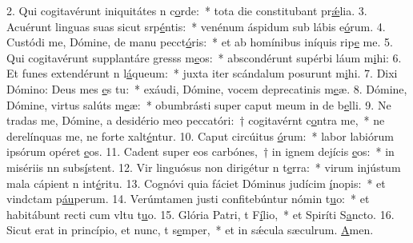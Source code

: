 2. Qui cogitavérunt iniquitátes n c\uline{o}rde:~* tota die constitubant pr\uline{ǽ}lia.
3. Acuérunt linguas suas sicut srp\uline{é}ntis:~* venénum áspidum sub lábis e\uline{ó}rum.
4. Custódi me, Dómine, de manu pecct\uline{ó}ris:~* et ab homínibus iníquis rip\uline{e} me.
5. Qui cogitavérunt supplantáre gresss m\uline{e}os:~* abscondérunt supérbi láum m\uline{i}hi:
6. Et funes extendérunt n l\uline{á}queum:~* juxta iter scándalum posurunt m\uline{i}hi.
7. Dixi Dómino: Deus mes \uline{e}s tu:~* exáudi, Dómine, vocem deprecatinis m\uline{e}æ.
8. Dómine, Dómine, virtus salúts m\uline{e}æ:~* obumbrásti super caput meum in de b\uline{e}lli.
9. Ne tradas me, Dómine, a desidério meo peccatóri:~† cogitavérnt c\uline{o}ntra me,~* ne derelínquas me, ne forte xalt\uline{é}ntur.
10. Caput circúitus \uline{ó}rum:~* labor labiórum ipsórum opéret \uline{e}os.
11. Cadent super eos carbónes,~† in ignem dejícis \uline{e}os:~* in misériis nn subs\uline{í}stent.
12. Vir linguósus non dirigétur n t\uline{e}rra:~* virum injústum mala cápient n int\uline{é}ritu.
13. Cognóvi quia fáciet Dóminus judícim \uline{í}nopis:~* et vindctam p\uline{áu}perum.
14. Verúmtamen justi confitebúntur nómin t\uline{u}o:~* et habitábunt recti cum vltu t\uline{u}o.
15. Glória Patri, t F\uline{í}lio,~* et Spiríti S\uline{a}ncto.
16. Sicut erat in princípio, et nunc, t s\uline{e}mper,~* et in sǽcula sæculrum. \uline{A}men.
